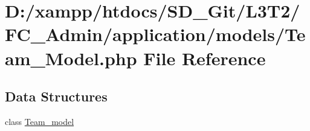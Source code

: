 \hypertarget{_admin_2application_2models_2_team___model_8php}{}\section{D\+:/xampp/htdocs/\+S\+D\+\_\+\+Git/\+L3\+T2/\+F\+C\+\_\+\+Admin/application/models/\+Team\+\_\+\+Model.php File Reference}
\label{_admin_2application_2models_2_team___model_8php}
\subsection*{Data Structures}
\begin{DoxyCompactItemize}
\item 
class \hyperlink{class_team__model}{Team\+\_\+model}
\end{DoxyCompactItemize}
